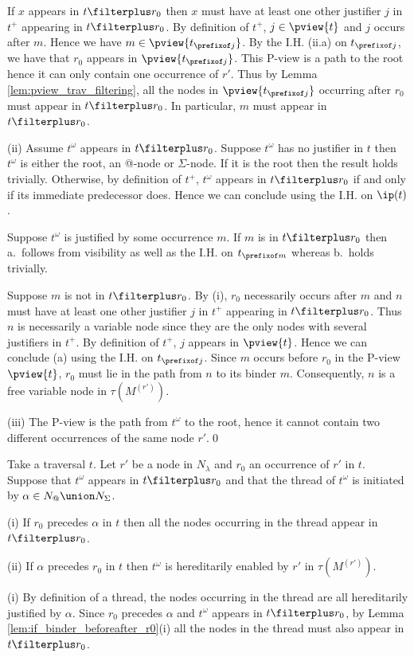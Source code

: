 If $x$ appears in $t\filterplus r_0$ then
$x$ must have at least one other justifier $j$ in $t^+$ appearing in $t\filterplus r_0$. By definition of $t^+$, $j\in \pview{t}$ and $j$ occurs after $m$. Hence we have $m \in \pview{t_{\prefixof j}}$.
By the I.H. (ii.a) on $t_{\prefixof j}$, we have that $r_0$ appears in $\pview{t_{\prefixof j}}$. This P-view is a path to the root hence it can only contain one occurrence of $r'$. Thus by
Lemma \ref{lem:pview_trav_filtering}, all the nodes in
$\pview{t_{\prefixof j}}$ occurring after $r_0$ must appear in $t\filterplus r_0$. In particular, $m$ must appear in $t\filterplus r_0$.

\noindent (ii) Assume $t^\omega$ appears in $t\filterplus r_0$.
Suppose $t^\omega$ has no justifier in $t$ then $t^\omega$ is either the root, an @-node or $\Sigma$-node. If it is the root then the result holds trivially. Otherwise, by definition of $t^+$, $t^\omega$
appears in $t\filterplus r_0$ if and only if its immediate predecessor does. Hence we can conclude using the I.H. on $\ip(t)$.

Suppose $t^\omega$ is justified by some occurrence $m$.
If $m$ is in $t\filterplus r_0$ then a.\ follows from
visibility as well as the I.H. on $t_{\prefixof m}$ whereas b.\ holds trivially.

Suppose $m$ is not in $t\filterplus r_0$.
By (i), $r_0$ necessarily occurs after $m$ and $n$ must have at least one other justifier $j$ in $t^+$ appearing in $t\filterplus r_0$. Thus $n$ is necessarily a variable node since they are the only nodes with several justifiers in $t^+$. By definition of $t^+$, $j$ appears in $\pview{t}$. Hence we can conclude (a) using the I.H. on $t_{\prefixof j}$. Since $m$ occurs before $r_0$ in the P-view $\pview{t}$, $r_0$ must lie in the path from $n$ to its binder $m$. Consequently, $n$ is a free variable node in $\tau(M^{(r')})$.

\noindent (iii) The P-view is the path from $t^\omega$ to the root, hence it cannot contain two different occurrences of the same node $r'$.\qed



\begin{lemma}
\label{lem:thread_filterplus}
Take a traversal $t$.  Let $r'$ be a node in $N_\lambda$ and $r_0$ an occurrence of $r'$ in $t$.
Suppose that $t^\omega$ appears in $t\filterplus r_0$ and that the thread of $t^\omega$ is initiated by $\alpha \in N_@ \union N_\Sigma$.

(i) If $r_0$ precedes $\alpha$ in $t$ then all the nodes occurring in the thread appear in $t\filterplus r_0$.

(ii) If $\alpha$ precedes $r_0$ in $t$ then
    $t^\omega$ is hereditarily enabled by $r'$ in $\tau(M^{(r')})$.
\end{lemma}
\proof
(i) By definition of a thread, the nodes occurring in the thread
are all hereditarily justified by $\alpha$.
Since $r_0$ precedes $\alpha$ and $t^\omega$ appears in $t\filterplus r_0$, by Lemma \ref{lem:if_binder_beforeafter_r0}(i) all the nodes in the thread must also appear in $t \filterplus r_0$.

